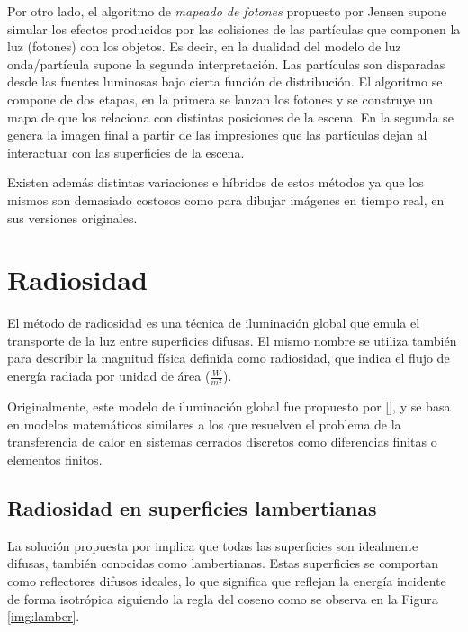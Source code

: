 Por otro lado, el algoritmo de \textit{mapeado de fotones} propuesto por Jensen \cite{Jensen} supone simular los efectos producidos por las colisiones de las partículas que componen la luz (fotones) con los objetos. Es decir, en la dualidad del modelo de luz onda/partícula supone la segunda interpretación. Las partículas son disparadas desde las fuentes luminosas bajo cierta función de distribución. El algoritmo se compone de dos etapas, en la primera se lanzan los fotones y se construye un mapa de que los relaciona con distintas posiciones de la escena. En la segunda se genera la imagen final a partir de las impresiones que las partículas dejan al interactuar con las superficies de la escena.

Existen además distintas variaciones e híbridos de estos métodos ya que los mismos son demasiado costosos como para dibujar imágenes en tiempo real, en sus versiones originales.

\section{Radiosidad}
\label{sec:radiosidad}

El método de radiosidad es una técnica de iluminación global que emula el transporte de la luz entre superficies difusas. El mismo nombre se utiliza también para describir la magnitud física definida como radiosidad, que indica el flujo de energía radiada por unidad de área ($\frac{W}{m^{2}}$).

Originalmente, este modelo de iluminación global fue propuesto por \citeauthor{Goral}[\cite{Goral}], y se basa en modelos matemáticos similares a los que resuelven el problema de la transferencia de calor en sistemas cerrados discretos como diferencias finitas o elementos finitos.

\subsection{Radiosidad en superficies lambertianas}

La solución propuesta por \citeauthor{Goral} implica que todas las superficies son idealmente difusas, también conocidas como lambertianas. Estas superficies se comportan como reflectores difusos ideales, lo que significa que reflejan la energía incidente de forma isotrópica siguiendo la regla del coseno como se observa en la Figura \ref{img:lamber}.

